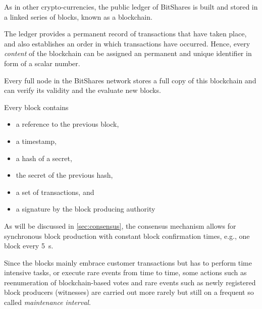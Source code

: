 \newcommand*\justify{%
  \fontdimen2\font=0.4em%
  \fontdimen3\font=0.2em%
  \fontdimen4\font=0.1em%
  \fontdimen7\font=0.1em%
  \hyphenchar\font=`\-%
}

As in other crypto-currencies, the public ledger of BitShares is built and
stored in a linked series of blocks, known as a blockchain.

The ledger provides a permanent record of transactions that have taken place,
and also establishes an order in which transactions have occurred. Hence, every
\emph{content} of the blockchain can be assigned an permanent and unique
identifier in form of a scalar number.

Every full node in the BitShares network stores a full copy of this blockchain
and can verify its validity and the evaluate new blocks.

Every block contains
\begin{itemize}
 \item a reference to the previous block,
 \item a timestamp,
 \item a hash of a secret,
 \item the secret of the previous hash,
 \item a set of transactions, and
 \item a signature by the block producing authority
\end{itemize}

As will be discussed in \cref{sec:consensus}, the consensus mechanism allows
for synchronous block production with constant block confirmation times, e.g.,
one block every \SI{5}{\second}.

Since the blocks mainly embrace customer transactions but has to perform time
intensive tasks, or execute rare events from time to time, some actions such as
reenumeration of blockchain-based votes and rare events such as newly
registered block producers (witnesses) are carried out more rarely but still on
a frequent so called \emph{maintenance interval}.

